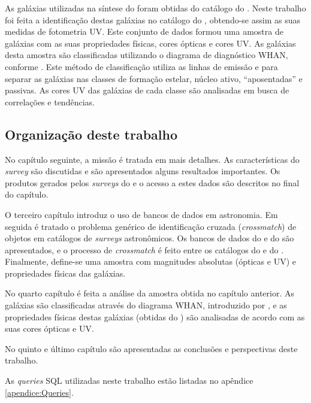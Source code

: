 As galáxias utilizadas na síntese do \starlight foram obtidas do catálogo do
\SDSS. Neste trabalho foi feita a identificação destas galáxias no catálogo do
\galex, obtendo-se assim as suas medidas de fotometria UV. Este conjunto de
dados formou uma amostra de galáxias com as suas propriedades físicas, cores
ópticas e cores UV. As galáxias desta amostra são classificadas utilizando o
diagrama de diagnóstico WHAN, conforme \citet{CidFernandes2011}. Este método de
classificação utiliza as linhas de emissão \Halpha e \NII para separar as
galáxias nas classes de formação estelar, núcleo ativo, ``aposentadas'' e
passivas. As cores UV das galáxias de cada classe são analisadas em busca de
correlações e tendências.

\subsection{Organização deste trabalho}

No capítulo seguinte, a missão \galex é tratada em mais detalhes. As
características do {\em survey} são discutidas e são apresentados alguns
resultados importantes. Os produtos gerados pelos {\em surveys} do \galex e o
acesso a estes dados são descritos no final do capítulo.

O terceiro capítulo introduz o uso de bancos de dados em astronomia. Em seguida
é tratado o problema genérico de identificação cruzada ({\em crossmatch}) de
objetos em catálogos de {\em surveys} astronômicos. Os bancos de dados do \SDSS
e do \starlight são apresentados, e o processo de {\em crossmatch} é feito entre
os catálogos do \SDSS e do \galex. Finalmente, define-se uma amostra com
magnitudes absolutas (ópticas e UV) e propriedades físicas das galáxias.

No quarto capítulo é feita a análise da amostra obtida no capítulo anterior. As
galáxias são classificadas através do diagrama WHAN, introduzido por
\citet{CidFernandes2010, CidFernandes2011}, e as propriedades físicas destas
galáxias (obtidas do \starlight) são analisadas de acordo com as suas cores
ópticas e UV.

No quinto e último capítulo são apresentadas as conclusões e perspectivas deste
trabalho.

As {\em queries} SQL utilizadas neste trabalho estão listadas no apêndice
\ref{apendice:Queries}.

